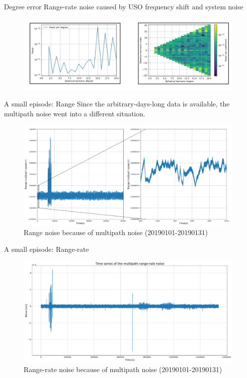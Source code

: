 \documentclass[12pt,english,ignorenonframetext,]{beamer}
\begin{document}
\begin{frame}{Degree error}
	Range-rate noise caused by USO frequency shift and system noise
	
	\begin{figure}
		\includegraphics{..//images//kbr_os_sy.jpg}
	\end{figure}
\end{frame}

\begin{frame}{A small episode: Range}
	Since the arbitrary-days-long data is available,  the multipath noise went into a different situation.
	
	\begin{figure}
		\includegraphics[height=0.5\textheight]{..//images//multipath_range_time.png}
		\caption{Range noise because of multipath noise (20190101-20190131)}
	\end{figure}
\end{frame}

\begin{frame}{A small episode: Range-rate}
	\begin{figure}
		\includegraphics{..//images//multipath_range_rate_time.png}
		\caption{Range-rate noise because of multipath noise (20190101-20190131)}
	\end{figure}
\end{frame}
\end{document}
